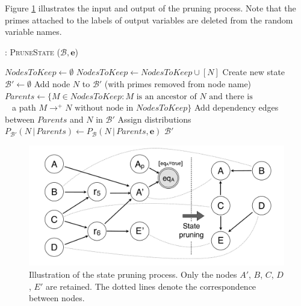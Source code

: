 Figure \ref{fig:pruning} illustrates the input and output of the pruning process. Note that the primes attached to the labels of output variables are deleted from the random variable names.

\begin{algorithm}[h]
\caption{: \textsc{PruneState} ($\mathcal{B}, \mathbf{e}$)}
\begin{algorithmic}[1] \vspace{1mm}
\STATE $\mathit{NodesToKeep} \leftarrow \emptyset$
\STATE $\mathit{NodesToKeep} \leftarrow \mathit{NodesToKeep} \cup [N]$ 
\ENDIF
\ENDFOR
\STATE Create new state $\mathcal{B}' \leftarrow \emptyset$
\STATE Add node $N$ to $\mathcal{B}'$ (with primes removed from node name)
\STATE $\mathit{Parents} \leftarrow \{M \in \mathit{NodesToKeep} : M \text{ is an ancestor of } N \text{ and there is } $ \\ $\phantom{a}$  \; \; \; \; \; \; \; \; \;  a path $M \rightarrow^+  N \text{ without node in } \mathit{NodesToKeep} \}$ 
\STATE Add dependency edges between $\mathit{Parents}$ and $N$ in $\mathcal{B}'$
\STATE Assign distributions $P_{\mathcal{B}'}(N \, | \, \mathit{Parents}) \leftarrow P_{\mathcal{B}}(N \, | \, \mathit{Parents}, \mathbf{e})$
\ENDFOR
\RETURN $\mathcal{B}'$
\end{algorithmic}
\label{algo:pruneState}
\end{algorithm}


\begin{figure}[h]
\centering
\includegraphics[scale=0.23]{imgs/pruning.pdf}
\caption{Illustration of the state pruning process. Only the nodes $A'$, $B$, $C$, $D$, $E'$ are retained. The dotted lines denote the correspondence between nodes.}
\label{fig:pruning}
\end{figure}


